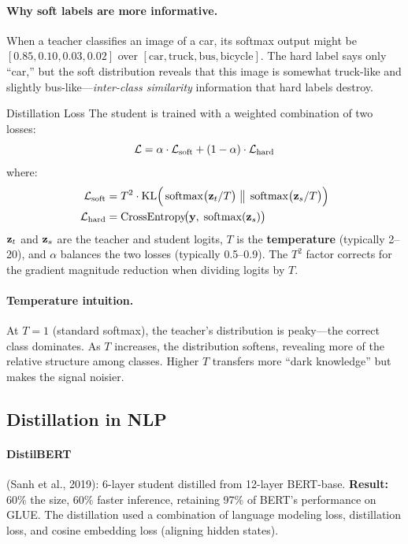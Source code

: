 \paragraph{Why soft labels are more informative.}
When a teacher classifies an image of a car, its softmax output might be
$[0.85, 0.10, 0.03, 0.02]$ over $[\text{car}, \text{truck}, \text{bus},
\text{bicycle}]$.  The hard label says only ``car,'' but the soft distribution reveals
that this image is somewhat truck-like and slightly bus-like---\emph{inter-class
similarity} information that hard labels destroy.

\begin{mathresult}{Distillation Loss}
The student is trained with a weighted combination of two losses:
\[
    \mathcal{L} = \alpha \cdot \mathcal{L}_{\text{soft}} + (1 - \alpha) \cdot \mathcal{L}_{\text{hard}}
\]
where:
\begin{align*}
    \mathcal{L}_{\text{soft}} &= T^2 \cdot \operatorname{KL}\!\Big(\operatorname{softmax}\!\big(\mathbf{z}_t / T\big) \;\big\|\; \operatorname{softmax}\!\big(\mathbf{z}_s / T\big)\Big) \\
    \mathcal{L}_{\text{hard}} &= \text{CrossEntropy}\!\big(\mathbf{y},\; \operatorname{softmax}(\mathbf{z}_s)\big)
\end{align*}
$\mathbf{z}_t$ and $\mathbf{z}_s$ are the teacher and student logits, $T$ is the \textbf{temperature}
(typically 2--20), and $\alpha$ balances the two losses (typically 0.5--0.9).  The $T^2$
factor corrects for the gradient magnitude reduction when dividing logits by $T$.
\end{mathresult}

\paragraph{Temperature intuition.}
At $T = 1$ (standard softmax), the teacher's distribution is peaky---the correct class
dominates.  As $T$ increases, the distribution softens, revealing more of the relative
structure among classes.  Higher $T$ transfers more ``dark knowledge'' but makes the
signal noisier.

\subsection{Distillation in NLP}

\paragraph{DistilBERT} (Sanh et al., 2019): 6-layer student distilled from 12-layer
BERT-base.  \textbf{Result:} 60\% the size, 60\% faster inference, retaining 97\% of
BERT's performance on GLUE.  The distillation used a combination of language modeling
loss, distillation loss, and cosine embedding loss (aligning hidden states).

